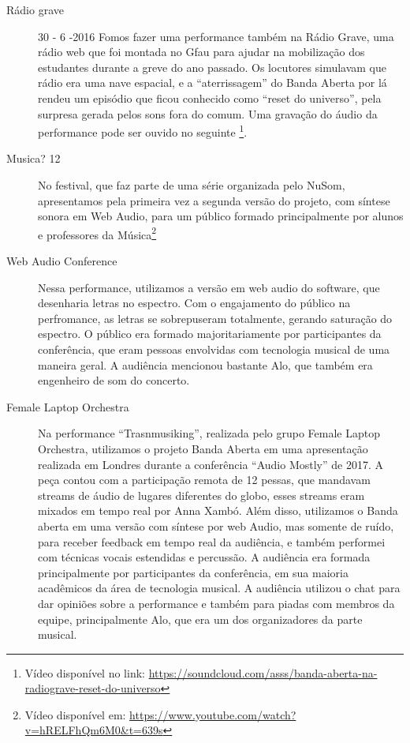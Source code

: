 \begin{description}
\item[Rádio grave] 30 - 6 -2016
Fomos fazer uma performance também na Rádio Grave, uma rádio web que foi montada no Gfau para ajudar na mobilização dos  estudantes durante a greve do ano passado. Os locutores simulavam que rádio era uma nave espacial, e a ``aterrissagem'' do Banda Aberta por lá rendeu um episódio que ficou conhecido como ``reset do universo'', pela surpresa gerada pelos sons fora do comum. Uma gravação do áudio da performance pode ser ouvido no seguinte \footnote{Vídeo disponível no link: \url{https://soundcloud.com/asss/banda-aberta-na-radiograve-reset-do-universo}}.


\item[Musica? 12]
No festival, que faz parte de uma série organizada pelo NuSom, apresentamos pela primeira vez a segunda versão do projeto, com síntese sonora em Web Audio, para um público formado principalmente por alunos e professores da Música\footnote{Vídeo disponível em: \url{https://www.youtube.com/watch?v=hRELFhQm6M0&t=639s}}


\item[Web Audio Conference] 
Nessa performance, utilizamos a versão em web audio do software, que desenharia letras no espectro. Com o engajamento do público na perfromance, as letras se sobrepuseram totalmente, gerando saturação do espectro. O público era formado majoritariamente por participantes da conferência, que eram pessoas envolvidas com tecnologia musical de uma maneira geral. A audiência mencionou bastante Alo, que também era engenheiro de som do concerto. 

\item[Female Laptop Orchestra]
Na performance ``Trasnmusiking'', realizada pelo grupo Female Laptop Orchestra, utilizamos o projeto Banda Aberta em uma apresentação realizada em Londres durante a conferência ``Audio Mostly'' de 2017. A peça contou com a participação remota de 12 pessas, que mandavam streams de áudio de lugares diferentes do globo, esses streams eram mixados em tempo real por Anna Xambó. Além disso, utilizamos o Banda aberta em uma versão com síntese por web Audio, mas somente de ruído, para receber feedback em tempo real da audiência, e também performei com técnicas vocais estendidas e percussão. A audiência era formada principalmente por participantes da conferência, em sua maioria acadêmicos da área de tecnologia musical. A audiência utilizou o chat para dar opiniões sobre a performance e também para piadas com membros da equipe, principalmente Alo, que era um dos organizadores da parte musical.



\end{description}
